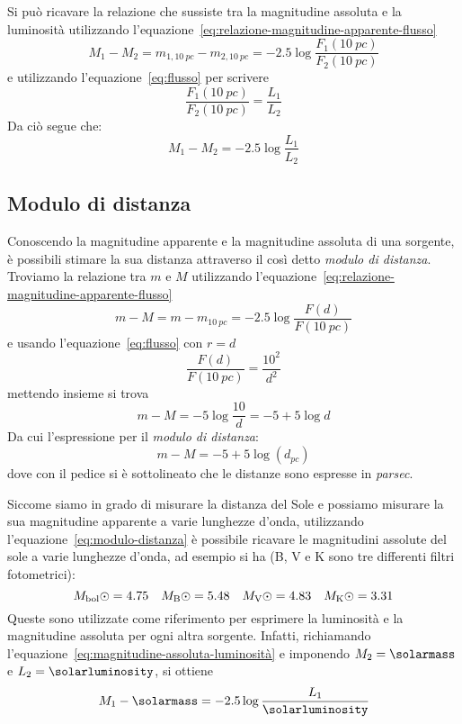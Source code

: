 Si può ricavare la relazione che sussiste tra la magnitudine assoluta e la luminosità utilizzando l'equazione~\eqref{eq:relazione-magnitudine-apparente-flusso}
\[
    M_1 - M_2 = m_{1, \SI{10}{pc}} - m_{2, \SI{10}{pc}} = -2.5 \log\frac{F_1 (\SI{10}{pc})}{F_2 (\SI{10}{pc})}
\]
e utilizzando l'equazione~\eqref{eq:flusso} per scrivere
\[
    \frac{F_1 (\SI{10}{pc})}{F_2 (\SI{10}{pc})} = \frac{L_1}{L_2}
\]
Da ciò segue che:
\begin{equation}\label{eq:magnitudine-assoluta-luminosità}
    M_1 - M_2 = -2.5 \log\frac{L_1}{L_2}
\end{equation}

\subsection{Modulo di distanza}
Conoscendo la magnitudine apparente e la magnitudine assoluta di una sorgente, è possibili stimare la sua distanza attraverso il così detto \emph{modulo di distanza}. Troviamo la relazione tra $m$ e $M$ utilizzando l'equazione~\eqref{eq:relazione-magnitudine-apparente-flusso}
\[
    m - M = m - m_{\SI{10}{pc}} = -2.5 \log\frac{F(d)}{F(\SI{10}{pc})}
\]
e usando l'equazione~\eqref{eq:flusso} con $r=d$
\[
    \frac{F(d)}{F(\SI{10}{pc})} = \frac{10^2}{d^2}
\]
mettendo insieme si trova
\[
    m - M = -5 \log\frac{10}{d} = -5 + 5 \log d
\]
Da cui l'espressione per il \emph{modulo di distanza}:
\begin{equation}\label{eq:modulo-distanza}
    m - M = -5 + 5 \log(d_{\si{pc}})
\end{equation}
dove con il pedice si è sottolineato che le distanze sono espresse in \emph{parsec}.

Siccome siamo in grado di misurare la distanza del Sole e possiamo misurare la sua magnitudine apparente a varie lunghezze d'onda, utilizzando l'equazione~\eqref{eq:modulo-distanza} è possibile ricavare le magnitudini assolute del sole a varie lunghezze d'onda, ad esempio si ha (B, V e K sono tre differenti filtri fotometrici):
\[
    M_\ensuremath{\textup{bol}\odot} = 4.75 \quad M_\ensuremath{\textup{B}\odot} = 5.48 \quad M_\ensuremath{\textup{V}\odot} = 4.83 \quad M_\ensuremath{\textup{K}\odot} = 3.31
\]
Queste sono utilizzate come riferimento per esprimere la luminosità e la magnitudine assoluta per ogni altra sorgente. Infatti, richiamando l'equazione~\eqref{eq:magnitudine-assoluta-luminosità} e imponendo $M_2 = \si{\solarmass}$ e $L_2 = \si{\solarluminosity}$, si ottiene
\begin{equation}\label{eq:magnitudine-assoluta-luminosità-sole}
    M_1 - \si{\solarmass} = -2.5 \log\frac{L_1}{\si{\solarluminosity}}
\end{equation}